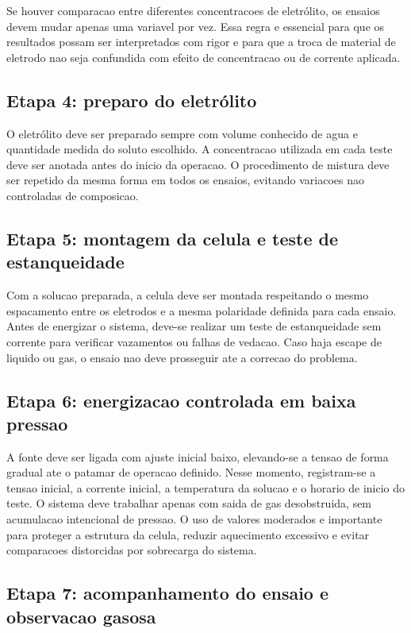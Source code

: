 \documentclass[12pt,oneside,a4paper,brazilian]{abntex2}
\begin{document}
Se houver comparacao entre diferentes concentracoes de eletrólito, os ensaios devem mudar apenas uma variavel por vez. Essa regra e essencial para que os resultados possam ser interpretados com rigor e para que a troca de material de eletrodo nao seja confundida com efeito de concentracao ou de corrente aplicada.

\subsection{Etapa 4: preparo do eletrólito}

O eletrólito deve ser preparado sempre com volume conhecido de agua e quantidade medida do soluto escolhido. A concentracao utilizada em cada teste deve ser anotada antes do inicio da operacao. O procedimento de mistura deve ser repetido da mesma forma em todos os ensaios, evitando variacoes nao controladas de composicao.

\subsection{Etapa 5: montagem da celula e teste de estanqueidade}

Com a solucao preparada, a celula deve ser montada respeitando o mesmo espacamento entre os eletrodos e a mesma polaridade definida para cada ensaio. Antes de energizar o sistema, deve-se realizar um teste de estanqueidade sem corrente para verificar vazamentos ou falhas de vedacao. Caso haja escape de liquido ou gas, o ensaio nao deve prosseguir ate a correcao do problema.

\subsection{Etapa 6: energizacao controlada em baixa pressao}

A fonte deve ser ligada com ajuste inicial baixo, elevando-se a tensao de forma gradual ate o patamar de operacao definido. Nesse momento, registram-se a tensao inicial, a corrente inicial, a temperatura da solucao e o horario de inicio do teste. O sistema deve trabalhar apenas com saida de gas desobstruida, sem acumulacao intencional de pressao. O uso de valores moderados e importante para proteger a estrutura da celula, reduzir aquecimento excessivo e evitar comparacoes distorcidas por sobrecarga do sistema.

\subsection{Etapa 7: acompanhamento do ensaio e observacao gasosa}
\end{document}
